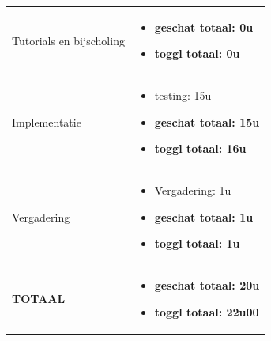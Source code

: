 \documentclass{article}
\begin{document}
\begin{center}
\begin{tabularx}{\textwidth}[t]{XX}
\vspace{1 mm}
Tutorials en bijscholing & 
\begin{minipage}[t]{\linewidth}%
\vspace{1 mm}
\begin{itemize}
\item \textbf{geschat totaal: 0u}
\item \textbf{toggl totaal: 0u}
\end{itemize} 
\vspace{1 mm}
\end{minipage}\\

\arrayrulecolor{black}\hline


\vspace{1 mm}
Implementatie & 
\begin{minipage}[t]{\linewidth}%
\vspace{1 mm}
\begin{itemize}
\item testing: 15u
\item \textbf{geschat totaal: 15u}
\item \textbf{toggl totaal: 16u}
\end{itemize} 
\vspace{1 mm}
\end{minipage}\\


\arrayrulecolor{black}\hline

\vspace{2 mm}
Vergadering & 
\begin{minipage}[t]{\linewidth}%
\vspace{2 mm}
\begin{itemize}
\item Vergadering: 1u
\item \textbf{geschat totaal: 1u}
\item \textbf{toggl totaal: 1u}
\vspace{2 mm}
\end{itemize} 
\end{minipage}\\

\arrayrulecolor{black}\hline

\vspace{2 mm}
\textbf{TOTAAL} & 
\begin{minipage}[t]{\linewidth}%
\vspace{2 mm}
\begin{itemize}
\item \textbf{geschat totaal: 20u}
\item \textbf{toggl totaal: 22u00}
\vspace{2 mm}
\end{itemize} 
\end{minipage}\\
\end{tabularx}
\end{center}
\end{document}
